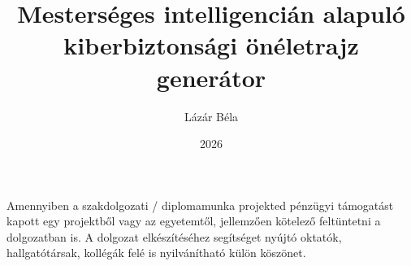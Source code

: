 \documentclass[
]{elteikthesis}[2026/03/09]
\title{Mesterséges intelligencián alapuló kiberbiztonsági önéletrajz generátor} %
\date{2026} %
\author{Lázár Béla}
\affiliation{Oktató, Egyetemi docens} %
\begin{document}



\maketitle


\tableofcontents
\cleardoublepage


\cleardoublepage


\cleardoublepage


\cleardoublepage


\cleardoublepage

\chapter*{\acklabel}
Amennyiben a szakdolgozati / diplomamunka projekted pénzügyi támogatást kapott egy projektből vagy az egyetemtől, jellemzően kötelező feltüntetni a dolgozatban is. A dolgozat elkészítéséhez segítséget nyújtó oktatók, hallgatótársak, kollégák felé is nyilvánítható külön köszönet.

\appendix

\cleardoublepage

{}
\printbibliography[title=\biblabel]
\cleardoublepage

{}
\listoffigures
\cleardoublepage

{}
\listoftables
\cleardoublepage

{}
\listofalgorithms
\cleardoublepage

{}
\lstlistoflistings
\cleardoublepage

\end{document}
